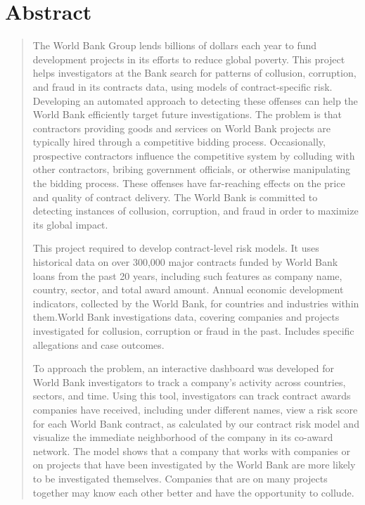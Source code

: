 \section*{\centering  \normalsize{Abstract} }
\begin{quotation}
\small
\noindent The World Bank Group lends billions of dollars each year to fund development projects in its efforts to reduce global poverty. This project helps investigators at the Bank search for patterns of collusion, corruption, and fraud in its contracts data, using models of contract-specific risk. Developing an automated approach to detecting these offenses can help the World Bank efficiently target future investigations. The problem is that contractors providing goods and services on World Bank projects are typically hired through a competitive bidding process. Occasionally, prospective contractors influence the competitive system by colluding with other contractors, bribing government officials, or otherwise manipulating the bidding process. These offenses have far-reaching effects on the price and quality of contract delivery. The World Bank is committed to detecting instances of collusion, corruption, and fraud in order to maximize its global impact. 

This project required to develop contract-level risk models. It uses historical data on over 300,000 major contracts funded by World Bank loans from the past 20 years, including such features as company name, country, sector, and total award amount. Annual economic development indicators, collected by the World Bank, for countries and industries within them.World Bank investigations data, covering companies and projects investigated for collusion, corruption or fraud in the past. Includes specific allegations and case outcomes.

To approach the problem,  an interactive dashboard was developed for World Bank investigators to track a company's activity across countries, sectors, and time. Using this tool, investigators can track contract awards companies have received, including under different names, view a risk score for each World Bank contract, as calculated by our contract risk model and visualize the immediate neighborhood of the company in its co-award network.
The model shows that a company that works with companies or on projects that have been investigated by the World Bank are more likely to be investigated themselves. Companies that are on many projects together may know each other better and have the opportunity to collude.


\end{quotation}
